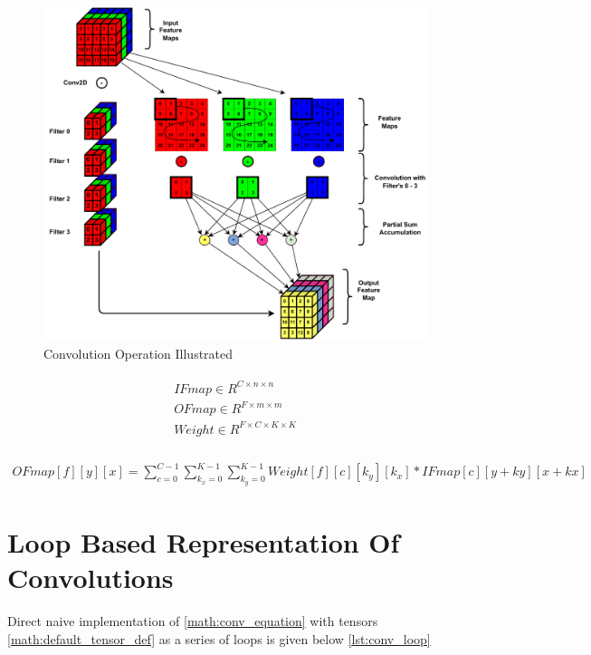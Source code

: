 \begin{figure}[ht]
    \centering
    \includegraphics[scale=0.6]{fig/ConvExplained.pdf}
    \caption{Convolution Operation Illustrated}
    \label{fig:conv_explained}
\end{figure}

\begin{align}
    \begin{split}
        IFmap \in R^{C \times n\times n} \\
        OFmap \in  R^{F \times m\times m} \\
        Weight \in R^{F \times C\times K\times K} \\
    \end{split}
    \label{math:default_tensor_def}
\end{align}

\begin{align}
    OFmap[f][y][x] = \displaystyle\sum\limits_{c=0}^{C-1}\displaystyle\sum\limits_{k_x=0}^{K-1}\displaystyle\sum\limits_{k_y=0}^{K-1}Weight[f][c][k_y][k_x]*IFmap[c][y+ky][x+kx]
    \label{math:conv_equation_1fp}
\end{align}

\section{Loop Based Representation Of Convolutions}
\label{chap:intro:conv_operation}

Direct naive implementation of \autoref{math:conv_equation} with tensors
\autoref{math:default_tensor_def} as a series of loops is given below
\autoref{lst:conv_loop}

